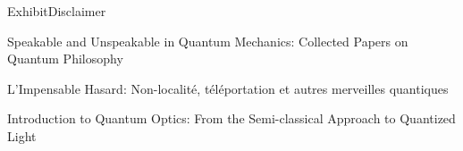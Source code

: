 \documentclass{beamer}
\begin{document}
\begin{frame}{Exhibit}{Disclaimer}
  \begin{description}
  \item Speakable and Unspeakable in Quantum Mechanics: Collected Papers on Quantum Philosophy
  \item L'Impensable Hasard: Non-localité, téléportation et autres merveilles quantiques
  \item Introduction to Quantum Optics: From the Semi-classical Approach to Quantized Light
  \end{description}
\end{frame}
\end{document}
